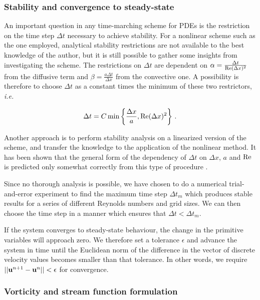 \documentclass[final,3p,twocolumn]{elsarticle}
\begin{document}
\subsubsection{Stability and convergence to steady-state}

An important question in any time-marching scheme for PDEs is the restriction
on the time step $\Delta t$ necessary to achieve stability. For a nonlinear
scheme such as the one employed, analytical stability restrictions are not
available to the best knowledge of the author, but it is still possible to
gather some insights from investigating the scheme. The restrictions on $\Delta
t$ are dependent on $\alpha = \frac{\Delta t}{{\rm Re} (\Delta x)^2}$ from the 
diffusive term and $\beta = \frac{a \Delta t}{\Delta x}$ from the convective
one. A possibility is therefore to choose $\Delta t$ as a constant times the
minimum of these two restrictors, {\em i.e.\ } 

\begin{equation}
    \Delta t = C \min \left\{ \frac{\Delta x}{a}, {\rm Re} (\Delta x)^2
    \right\} \,.
    \label{eq:timeStep}
\end{equation}
 
Another approach is to perform stability analysis on a linearized version of
the scheme, and transfer the knowledge to the application of the nonlinear
method. It has been shown that the general form of the dependency of $\Delta
t$ on $\Delta x$, $a$ and ${\rm Re}$ is predicted only somewhat correctly from
this type of procedure \cite{kress2006time}. 

Since no thorough analysis is possible, we have chosen to do a numerical
trial-and-error experiment to find the maximum time step $\Delta t_m$ which
produces stable results for a series of different Reynolds numbers and grid
sizes. We can then choose the time step in a manner which ensures that $\Delta
t < \Delta t_m$. 

If the system converges to steady-state behaviour, the change in the primitive
variables will approach zero. We therefore set a tolerance $\epsilon$ and
advance the system in time until the Euclidean norm of the difference in the
vector of discrete velocity values becomes smaller than that tolerance.
In other words, we require $||{\bf u}^{n+1} - {\bf u}^{n}|| < \epsilon$ for
convergence. 

\subsubsection{Vorticity and stream function formulation}
\end{document}
